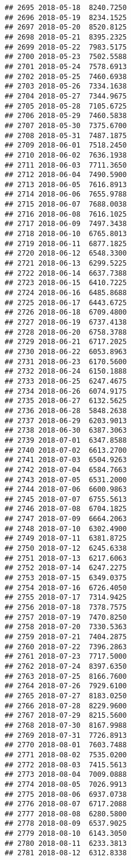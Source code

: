 \documentclass[
]{article}
\begin{document}
\begin{verbatim}
## 2695 2018-05-18  8240.7250
## 2696 2018-05-19  8234.1525
## 2697 2018-05-20  8520.8125
## 2698 2018-05-21  8395.2325
## 2699 2018-05-22  7983.5175
## 2700 2018-05-23  7502.5588
## 2701 2018-05-24  7578.6913
## 2702 2018-05-25  7460.6938
## 2703 2018-05-26  7334.1638
## 2704 2018-05-27  7344.9675
## 2705 2018-05-28  7105.6725
## 2706 2018-05-29  7460.5838
## 2707 2018-05-30  7375.6700
## 2708 2018-05-31  7487.1875
## 2709 2018-06-01  7518.2450
## 2710 2018-06-02  7636.1938
## 2711 2018-06-03  7711.3650
## 2712 2018-06-04  7490.5900
## 2713 2018-06-05  7616.8913
## 2714 2018-06-06  7655.9788
## 2715 2018-06-07  7688.0038
## 2716 2018-06-08  7616.1025
## 2717 2018-06-09  7497.3438
## 2718 2018-06-10  6765.8013
## 2719 2018-06-11  6877.1825
## 2720 2018-06-12  6548.3300
## 2721 2018-06-13  6299.5225
## 2722 2018-06-14  6637.7388
## 2723 2018-06-15  6410.7225
## 2724 2018-06-16  6485.8688
## 2725 2018-06-17  6443.6725
## 2726 2018-06-18  6709.4800
## 2727 2018-06-19  6737.4138
## 2728 2018-06-20  6758.3788
## 2729 2018-06-21  6717.2025
## 2730 2018-06-22  6053.8963
## 2731 2018-06-23  6170.5600
## 2732 2018-06-24  6150.1888
## 2733 2018-06-25  6247.4675
## 2734 2018-06-26  6074.9175
## 2735 2018-06-27  6132.5625
## 2736 2018-06-28  5848.2638
## 2737 2018-06-29  6203.9013
## 2738 2018-06-30  6387.3063
## 2739 2018-07-01  6347.8588
## 2740 2018-07-02  6613.2700
## 2741 2018-07-03  6504.9263
## 2742 2018-07-04  6584.7663
## 2743 2018-07-05  6531.2000
## 2744 2018-07-06  6600.9863
## 2745 2018-07-07  6755.5613
## 2746 2018-07-08  6704.1825
## 2747 2018-07-09  6664.2063
## 2748 2018-07-10  6302.4900
## 2749 2018-07-11  6381.8725
## 2750 2018-07-12  6245.6338
## 2751 2018-07-13  6217.6063
## 2752 2018-07-14  6247.2275
## 2753 2018-07-15  6349.0375
## 2754 2018-07-16  6726.4050
## 2755 2018-07-17  7314.9425
## 2756 2018-07-18  7378.7575
## 2757 2018-07-19  7470.8250
## 2758 2018-07-20  7330.5363
## 2759 2018-07-21  7404.2875
## 2760 2018-07-22  7396.2863
## 2761 2018-07-23  7717.5000
## 2762 2018-07-24  8397.6350
## 2763 2018-07-25  8166.7600
## 2764 2018-07-26  7929.6100
## 2765 2018-07-27  8183.0250
## 2766 2018-07-28  8229.9600
## 2767 2018-07-29  8215.5600
## 2768 2018-07-30  8167.9988
## 2769 2018-07-31  7726.8913
## 2770 2018-08-01  7603.7488
## 2771 2018-08-02  7535.0200
## 2772 2018-08-03  7415.5613
## 2773 2018-08-04  7009.0888
## 2774 2018-08-05  7026.9913
## 2775 2018-08-06  6937.0738
## 2776 2018-08-07  6717.2088
## 2777 2018-08-08  6280.5800
## 2778 2018-08-09  6537.9025
## 2779 2018-08-10  6143.3050
## 2780 2018-08-11  6233.3813
## 2781 2018-08-12  6312.8338

\end{verbatim}
\end{document}
